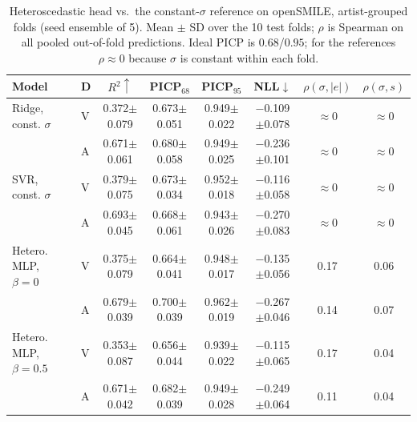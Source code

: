 \begin{table}[t]
\centering
\caption{Heteroscedastic head vs.\ the constant-$\sigma$ reference on openSMILE, artist-grouped folds (seed ensemble of 5). Mean $\pm$ SD over the 10 test folds; $\rho$ is Spearman on all pooled out-of-fold predictions. Ideal PICP is $0.68$/$0.95$; for the references $\rho\approx0$ because $\sigma$ is constant within each fold.}
\label{tab:hetero}
\footnotesize
\setlength{\tabcolsep}{5pt}
\begin{tabular}{@{}llcccccc@{}}
\toprule
Model & D & $R^2\uparrow$ & PICP$_{68}$ & PICP$_{95}$ & NLL$\downarrow$ & $\rho(\sigma,|e|)$ & $\rho(\sigma,s)$ \\
\midrule
Ridge, const. $\sigma$ & V & 0.372$\pm$0.079 & 0.673$\pm$0.051 & 0.949$\pm$0.022 & $-$0.109$\pm$0.078 & $\approx$0 & $\approx$0 \\
 & A & 0.671$\pm$0.061 & 0.680$\pm$0.058 & 0.949$\pm$0.025 & $-$0.236$\pm$0.101 & $\approx$0 & $\approx$0 \\
\midrule
SVR, const. $\sigma$ & V & 0.379$\pm$0.075 & 0.673$\pm$0.034 & 0.952$\pm$0.018 & $-$0.116$\pm$0.058 & $\approx$0 & $\approx$0 \\
 & A & 0.693$\pm$0.045 & 0.668$\pm$0.061 & 0.943$\pm$0.026 & $-$0.270$\pm$0.083 & $\approx$0 & $\approx$0 \\
\midrule
Hetero. MLP, $\beta{=}0$ & V & 0.375$\pm$0.079 & 0.664$\pm$0.041 & 0.948$\pm$0.017 & $-$0.135$\pm$0.056 & 0.17 & 0.06 \\
 & A & 0.679$\pm$0.039 & 0.700$\pm$0.039 & 0.962$\pm$0.019 & $-$0.267$\pm$0.046 & 0.14 & 0.07 \\
\midrule
Hetero. MLP, $\beta{=}0.5$ & V & 0.353$\pm$0.087 & 0.656$\pm$0.044 & 0.939$\pm$0.022 & $-$0.115$\pm$0.065 & 0.17 & 0.04 \\
 & A & 0.671$\pm$0.042 & 0.682$\pm$0.039 & 0.949$\pm$0.028 & $-$0.249$\pm$0.064 & 0.11 & 0.04 \\
\bottomrule
\end{tabular}
\end{table}
